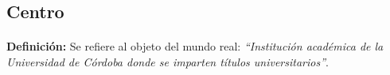 \subsection{Centro}

  \paragraph{}\textbf{Definición:} Se refiere al objeto del mundo real:
  \emph{``Institución académica de la Universidad de Córdoba donde se imparten
  títulos universitarios''}.



